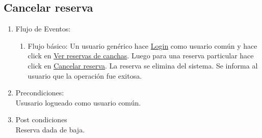 \documentclass[a4paper,11pt]{article}
\begin{document}
\subsection{Cancelar reserva}
\begin{enumerate}


    \begin{enumerate}
    \item Descripción breve: \\
        Se da de baja una determinada reserva.
    \item Actores \\
        Usuario logueado como usuario común.
    \item Disparadores: \\
        Click en el botón \underline{Cancelar reserva} dentro de la
        página que muestra las reservas de una cancha.
    \end{enumerate}

    \item Flujo de Eventos: 

    \begin{enumerate}

        \item Flujo básico:
            Un usuario genérico hace \underline{Login} como usuario común y
            hace click en \underline{Ver reservas de canchas}. Luego para una
            reserva particular hace click en \underline{Cancelar reserva}.
            La reserva se elimina del sistema. Se informa al usuario que la
            operación fue exitosa.

    \end{enumerate}

    \item Precondiciones: \\
        Ususario logueado como usuario común.

    \item Post condiciones \\
        Reserva dada de baja.

\end{enumerate}
\end{document}
